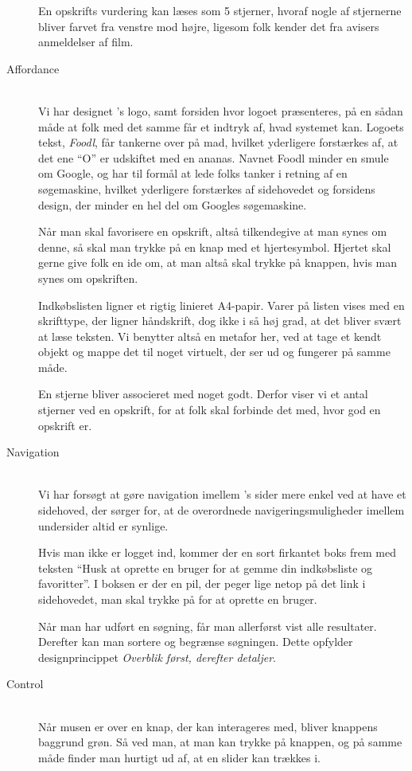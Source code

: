 \begin{description}
En opskrifts vurdering kan læses som 5 stjerner, hvoraf nogle af stjernerne bliver farvet fra venstre mod højre, ligesom folk kender det fra \fx avisers anmeldelser af film.

\item[Affordance] \hfill \\
Vi har designet \Foodl{}'s logo, samt forsiden hvor logoet præsenteres, på en sådan måde at folk med det samme får et indtryk af, hvad systemet kan. Logoets tekst, \textit{Foodl}, får tankerne over på mad, hvilket yderligere forstærkes af, at det ene ``O'' er udskiftet med en ananas. Navnet Foodl minder en smule om Google, og har til formål at lede folks tanker i retning af en søgemaskine, hvilket yderligere forstærkes af sidehovedet og forsidens design, der minder en hel del om Googles søgemaskine.

Når man skal favorisere en opskrift, altså tilkendegive at man synes om denne, så skal man trykke på en knap med et hjertesymbol. Hjertet skal gerne give folk en ide om, at man altså skal trykke på knappen, hvis man synes om opskriften.

Indkøbslisten ligner et rigtig linieret A4-papir. Varer på listen vises med en skrifttype, der ligner håndskrift, dog ikke i så høj grad, at det bliver svært at læse teksten. Vi benytter altså en metafor her, ved at tage et kendt objekt og mappe det til noget virtuelt, der ser ud og fungerer på samme måde.

En stjerne bliver associeret med noget godt. Derfor viser vi et antal stjerner ved en opskrift, for at folk skal forbinde det med, hvor god en opskrift er.

\item[Navigation] \hfill \\
Vi har forsøgt at gøre navigation imellem \Foodl's sider mere enkel ved at have et sidehoved, der sørger for, at de overordnede navigeringsmuligheder imellem undersider altid er synlige.

Hvis man ikke er logget ind, kommer der en sort firkantet boks frem med teksten ``Husk at oprette en bruger for at gemme din indkøbsliste og favoritter''. I boksen er der en pil, der peger lige netop på det link i sidehovedet, man skal trykke på for at oprette en bruger.

Når man har udført en søgning, får man allerførst vist alle resultater. Derefter kan man sortere og begrænse søgningen. Dette opfylder designprincippet \textit{Overblik først, derefter detaljer}.

\item[Control] \hfill \\
Når musen er over en knap, der kan interageres med, bliver knappens baggrund grøn. Så ved man, at man kan trykke på knappen, og på samme måde finder man hurtigt ud af, at en slider kan trækkes i.
  

\end{description}
